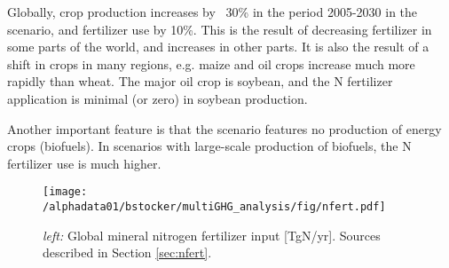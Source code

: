 \documentclass{myreport}
\begin{document}
Globally, crop production increases by ~30\% in the period 2005-2030 in the scenario, and fertilizer use by 10\%. This is the result of decreasing fertilizer in some parts of the world, and increases in other parts. It is also the result of a shift in crops in many regions, e.g. maize and oil crops increase much more rapidly than wheat. The major oil crop is soybean, and the N fertilizer application is minimal (or zero) in soybean production.

Another important feature is that the scenario features no production of energy crops (biofuels). In scenarios with large-scale production of biofuels, the N fertilizer use is much higher.


\begin{figure}[ht!]
\begin{center}
\texttt{[image: /alphadata01/bstocker/multiGHG\_analysis/fig/nfert.pdf]}
\end{center}
\caption{{\sl left:} Global mineral nitrogen fertilizer input [TgN/yr]. Sources described in Section \ref{sec:nfert}.}
\label{fig:nfert_global}
\end{figure}
\end{document}
